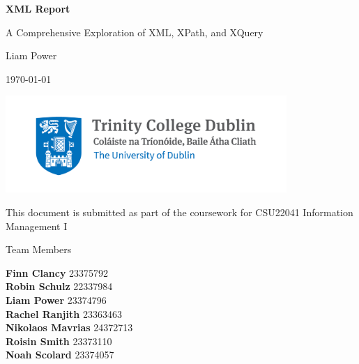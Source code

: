 \documentclass{article} %
\begin{document}
\begin{titlepage}
    \centering
    \vspace*{1cm}

    {\Huge \bfseries XML Report \par}
    \vspace{1.5cm}

    {\Large A Comprehensive Exploration of XML, XPath, and XQuery \par}
    \vspace{2cm}

    {\large Liam Power \par}
    \vspace{0.5cm}

    {\large \today \par}

    \vfill
    \includegraphics[width=0.8\textwidth]{Trinity_Main_Logo.jpg} %

    \vfill
    {\large This document is submitted as part of the coursework for CSU22041 Information Management I}

\end{titlepage}

\begin{newpage}
\thispagestyle{empty} %

\vspace*{\fill} %

\begin{center}
    {\LARGE Team Members}
    
    \vspace{1cm} %

    {\Large 
        \textbf{Finn Clancy}         23375792\\[0.5cm]
        \textbf{Robin Schulz}        22337984\\[0.5cm]
        \textbf{Liam Power}          23374796\\[0.5cm]
        \textbf{Rachel Ranjith}      23363463\\[0.5cm]
        \textbf{Nikolaos Mavrias}    24372713\\[0.5cm]
        \textbf{Roisin Smith}        23373110\\[0.5cm]
        \textbf{Noah Scolard}        23374057\\[0.5cm]
    }
\end{center}

\vspace*{\fill} %
\end{newpage}
\end{document}
